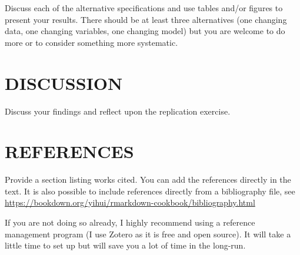 \documentclass[
  12pt,
]{article}
\begin{document}
Discuss each of the alternative specifications and use tables and/or
figures to present your results. There should be at least three
alternatives (one changing data, one changing variables, one changing
model) but you are welcome to do more or to consider something more
systematic.

\hypertarget{discussion}{%
\section{DISCUSSION}\label{discussion}}

Discuss your findings and reflect upon the replication exercise.

\hypertarget{references}{%
\section{REFERENCES}\label{references}}

Provide a section listing works cited. You can add the references
directly in the text. It is also possible to include references directly
from a bibliography file, see
\url{https://bookdown.org/yihui/rmarkdown-cookbook/bibliography.html}

If you are not doing so already, I highly recommend using a reference
management program (I use Zotero as it is free and open source). It will
take a little time to set up but will save you a lot of time in the
long-run.
\end{document}
